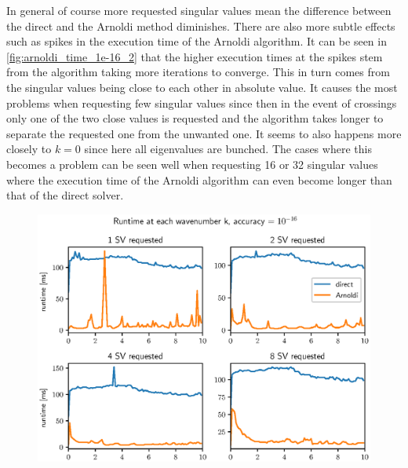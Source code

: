 \documentclass[a4paper, oneside]{thirdparty_stylesheets/discothesis}
\begin{document}
In general of course more requested singular values mean the difference between the direct and the Arnoldi method diminishes.
There are also more subtle effects such as spikes in the execution time of the Arnoldi algorithm.
It can be seen in \ref{fig:arnoldi_time_1e-16_2} that the higher execution times at the spikes stem from the algorithm taking more iterations to converge.
This in turn comes from the singular values being close to each other in absolute value.
It causes the most problems when requesting few singular values since then in the event of crossings only one of the two close values is requested and the algorithm takes longer to separate the requested one from the unwanted one.
It seems to also happens more closely to $k=0$ since here all eigenvalues are bunched.
The cases where this becomes a problem can be seen well when requesting 16 or 32 singular values where the execution time of the Arnoldi algorithm can even become longer than that of the direct solver.
\begin{figure} [H]
	\centering
	\includegraphics[width=0.9\columnwidth]{figures/arnoldi_time_1e-16_1.eps}
	\label{fig:arnoldi_time_1e-16_1}
\end{figure}
\end{document}
